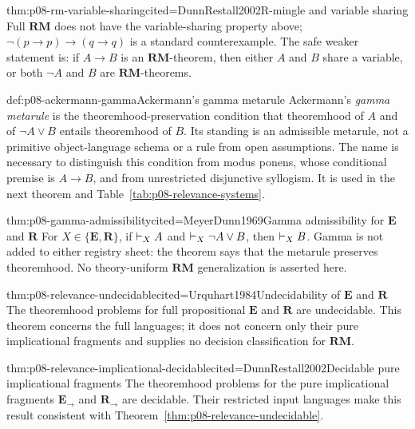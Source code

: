 \begin{hbtheorem}{thm:p08-rm-variable-sharing}{cited=DunnRestall2002}{R-mingle and variable sharing}
Full \(\mathbf{RM}\) does not have the variable-sharing property above;
\(\neg(p\to p)\to(q\to q)\) is a standard counterexample.  The safe weaker
statement is: if \(A\to B\) is an \(\mathbf{RM}\)-theorem, then either
\(A\) and \(B\) share a variable, or both \(\neg A\) and \(B\) are
\(\mathbf{RM}\)-theorems.
\end{hbtheorem}

\begin{hbdefinition}{def:p08-ackermann-gamma}{Ackermann's gamma metarule}
Ackermann's \emph{gamma metarule} is the theoremhood-preservation condition
that theoremhood of \(A\) and of \(\neg A\lor B\) entails theoremhood of
\(B\).  Its standing is an admissible metarule, not a primitive object-language
schema or a rule from open assumptions.  The name is necessary to distinguish
this condition from modus ponens, whose conditional premise is \(A\to B\),
and from unrestricted disjunctive syllogism.  It is used in the next theorem
and Table~\ref{tab:p08-relevance-systems}.
\end{hbdefinition}

\begin{hbtheorem}{thm:p08-gamma-admissibility}{cited=MeyerDunn1969}{Gamma admissibility for \(\mathbf E\) and \(\mathbf R\)}
For \(X\in\{\mathbf E,\mathbf R\}\), if
\(\vdash_X A\) and \(\vdash_X\neg A\lor B\), then
\(\vdash_X B\).  Gamma is not added to either registry sheet: the theorem
says that the metarule preserves theoremhood.  No theory-uniform
\(\mathbf{RM}\) generalization is asserted here.
\end{hbtheorem}

\begin{hbtheorem}{thm:p08-relevance-undecidable}{cited=Urquhart1984}{Undecidability of \(\mathbf E\) and \(\mathbf R\)}
The theoremhood problems for full propositional \(\mathbf E\) and
\(\mathbf R\) are undecidable.  This theorem concerns the full languages; it
does not concern only their pure implicational fragments and supplies no
decision classification for \(\mathbf{RM}\).
\end{hbtheorem}

\begin{hbtheorem}{thm:p08-relevance-implicational-decidable}{cited=DunnRestall2002}{Decidable pure implicational fragments}
The theoremhood problems for the pure implicational fragments
\(\mathbf E_{\to}\) and \(\mathbf R_{\to}\) are decidable.  Their restricted
input languages make this result consistent with
Theorem~\ref{thm:p08-relevance-undecidable}.
\end{hbtheorem}

